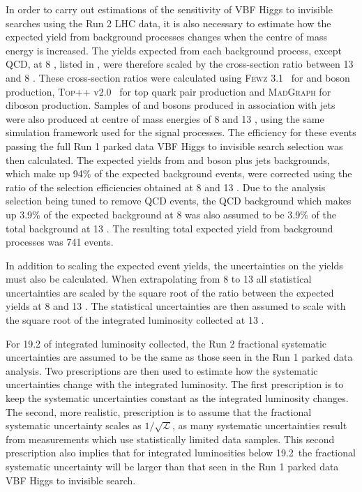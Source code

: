 In order to carry out estimations of the sensitivity of \ac{VBF} Higgs to invisible searches using the Run 2 LHC data, it is also necessary to estimate how the expected yield from background processes changes when the centre of mass energy is increased. The yields expected from each background process, except \ac{QCD}, at 8 \TeV, listed in , were therefore scaled by the cross-section ratio between 13 and 8 \TeV. These cross-section ratios were calculated using \textsc{Fewz} 3.1~\cite{PhysRevD.86.094034} for \PW and \PZ boson production, \textsc{Top++} v2.0~\cite{Czakon20142930} for top quark pair production and \textsc{MadGraph} for diboson production. Samples of \PW and \PZ bosons produced in association with jets were also produced at centre of mass energies of 8 and 13 \TeV, using the same simulation framework used for the signal processes. The efficiency for these events passing the full Run 1 parked data \ac{VBF} Higgs to invisible search selection was then calculated. The expected yields from \PW and \PZ boson plus jets backgrounds, which make up 94\% of the expected background events, were corrected using the ratio of the selection efficiencies obtained at 8 and 13 \TeV. Due to the analysis selection being tuned to remove \ac{QCD} events, the \ac{QCD} background which makes up 3.9\% of the expected background at 8 \TeV was also assumed to be 3.9\% of the total background at 13 \TeV. The resulting total expected yield from background processes was 741 events.

In addition to scaling the expected event yields, the uncertainties on the yields must also be calculated. When extrapolating from 8 to 13 \TeV all statistical uncertainties are scaled by the square root of the ratio between the expected yields at 8 \TeV and 13 \TeV. The statistical uncertainties are then assumed to scale with the square root of the integrated luminosity collected at 13 \TeV.

For 19.2 \invfb of integrated luminosity collected, the Run 2 fractional systematic uncertainties are assumed to be the same as those seen in the Run 1 parked data analysis. Two prescriptions are then used to estimate how the systematic uncertainties change with the integrated luminosity. The first prescription is to keep the systematic uncertainties constant as the integrated luminosity changes. The second, more realistic, prescription is to assume that the fractional systematic uncertainty scales as $1/\sqrt{\mathcal{L}}$, as many systematic uncertainties result from measurements which use statistically limited data samples. This second prescription also implies that for integrated luminosities below 19.2 \invfb\,the fractional systematic uncertainty will be larger than that seen in the Run 1 parked data \ac{VBF} Higgs to invisible search.


